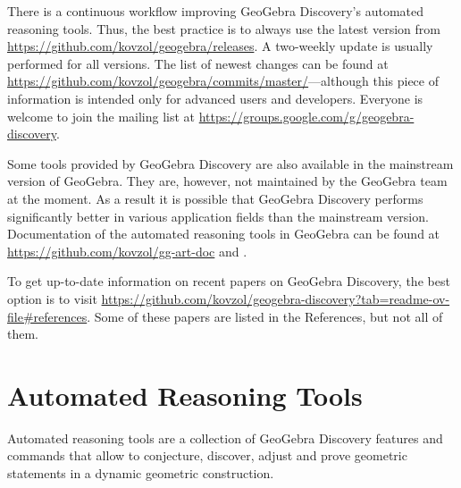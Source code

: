 \documentclass{article}
\begin{document}
There is a continuous workflow improving GeoGebra Discovery's automated reasoning tools. Thus, the best practice is to always use the latest version from \url{https://github.com/kovzol/geogebra/releases}. A two-weekly update is usually performed for all versions. The list of newest changes can be found at \url{https://github.com/kovzol/geogebra/commits/master/}---although this piece of information is intended only for advanced users and developers. Everyone is welcome to join the mailing list at \url{https://groups.google.com/g/geogebra-discovery}.

Some tools provided by GeoGebra Discovery are also available in the mainstream version of GeoGebra. They are, however, not maintained by the GeoGebra team at the moment. As a result it is possible that GeoGebra Discovery performs significantly better in various application fields than the mainstream version. Documentation of the automated reasoning tools in GeoGebra can be found at \url{https://github.com/kovzol/gg-art-doc} and
\cite{KovacsRecioVelez2}.

To get up-to-date information on recent papers on GeoGebra Discovery, the best option is to visit \url{https://github.com/kovzol/geogebra-discovery?tab=readme-ov-file#references}. Some of these papers are listed in the References, but not all of them.

\section{Automated Reasoning Tools}\label{sec:art}

Automated reasoning tools are a collection of GeoGebra Discovery features and commands that allow to conjecture, discover, adjust and prove geometric statements in a dynamic geometric construction.
\end{document}
